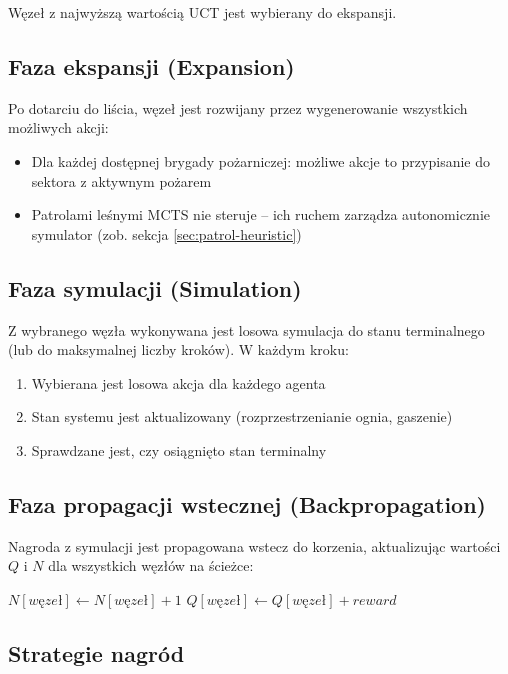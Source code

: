 Węzeł z najwyższą wartością UCT jest wybierany do ekspansji.

\subsection{Faza ekspansji (Expansion)}

Po dotarciu do liścia, węzeł jest rozwijany przez wygenerowanie wszystkich możliwych akcji:
\begin{itemize}
    \item Dla każdej dostępnej brygady pożarniczej: możliwe akcje to przypisanie do sektora z aktywnym pożarem
    \item Patrolami leśnymi MCTS nie steruje -- ich ruchem zarządza autonomicznie symulator (zob. sekcja \ref{sec:patrol-heuristic})
\end{itemize}

\subsection{Faza symulacji (Simulation)}

Z wybranego węzła wykonywana jest losowa symulacja do stanu terminalnego (lub do maksymalnej liczby kroków). W każdym kroku:
\begin{enumerate}
    \item Wybierana jest losowa akcja dla każdego agenta
    \item Stan systemu jest aktualizowany (rozprzestrzenianie ognia, gaszenie)
    \item Sprawdzane jest, czy osiągnięto stan terminalny
\end{enumerate}

\subsection{Faza propagacji wstecznej (Backpropagation)}

Nagroda z symulacji jest propagowana wstecz do korzenia, aktualizując wartości $Q$ i $N$ dla wszystkich węzłów na ścieżce:

\begin{algorithmic}
    \State $N[węzeł] \gets N[węzeł] + 1$
    \State $Q[węzeł] \gets Q[węzeł] + reward$
\EndFor
\end{algorithmic}

\subsection{Strategie nagród}

